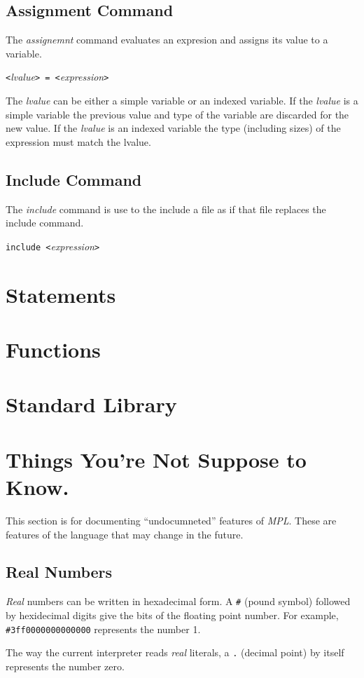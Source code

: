 \documentclass{article}
\begin{document}
\subsection{Assignment Command}
The \emph{assignemnt} command evaluates an expresion and
assigns its value to a variable.
\begin{center}
  \verb|<|\emph{lvalue}\verb|> = <|\emph{expression}\verb|>|
\end{center}
The \emph{lvalue} can be either a simple variable or an indexed variable.
If the \emph{lvalue} is a simple variable the previous value and
type of the variable are discarded for the new value.
If the \emph{lvalue} is an indexed variable the type (including sizes)
of the expression must match the lvalue.
\subsection{Include Command}
The \emph{include} command is use to the include a file as if
that file replaces the include command.
\begin{center}
  \verb|include <|\emph{expression}\verb|>|
\end{center}
\section{Statements}
\section{Functions}
\section{Standard Library}
\section{Things You're Not Suppose to Know.}
This section is for documenting ``undocumneted'' features of \emph{MPL}.
These are features of the language that may change in the future.
\subsection{Real Numbers}
\emph{Real} numbers can be written in hexadecimal form.
A \verb|#| (pound symbol) followed by hexidecimal digits give the bits
of the floating point number. For example, \verb|#3ff0000000000000|
represents the number 1.

The way the current interpreter reads \emph{real} literals,
a \verb|.| (decimal point) by itself represents the number
zero.
\end{document}
